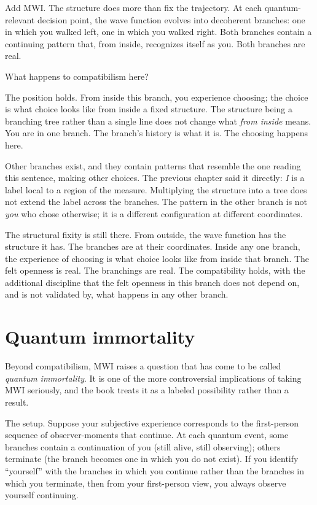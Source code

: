 Add MWI. The structure does more than fix the trajectory. At each quantum-relevant decision point, the wave function evolves into decoherent branches: one in which you walked left, one in which you walked right. Both branches contain a continuing pattern that, from inside, recognizes itself as you. Both branches are real.

What happens to compatibilism here?

The position holds. From inside this branch, you experience choosing; the choice is what choice looks like from inside a fixed structure. The structure being a branching tree rather than a single line does not change what \emph{from inside} means. You are in one branch. The branch's history is what it is. The choosing happens here.

Other branches exist, and they contain patterns that resemble the one reading this sentence, making other choices. The previous chapter said it directly: \emph{I} is a label local to a region of the measure. Multiplying the structure into a tree does not extend the label across the branches. The pattern in the other branch is not \emph{you} who chose otherwise; it is a different configuration at different coordinates.

The structural fixity is still there. From outside, the wave function has the structure it has. The branches are at their coordinates. Inside any one branch, the experience of choosing is what choice looks like from inside that branch. The felt openness is real. The branchings are real. The compatibility holds, with the additional discipline that the felt openness in this branch does not depend on, and is not validated by, what happens in any other branch.

\section*{Quantum immortality}

Beyond compatibilism, MWI raises a question that has come to be called \emph{quantum immortality}. It is one of the more controversial implications of taking MWI seriously, and the book treats it as a labeled possibility rather than a result.

The setup. Suppose your subjective experience corresponds to the first-person sequence of observer-moments that continue. At each quantum event, some branches contain a continuation of you (still alive, still observing); others terminate (the branch becomes one in which you do not exist). If you identify ``yourself'' with the branches in which you continue rather than the branches in which you terminate, then from your first-person view, you always observe yourself continuing.

